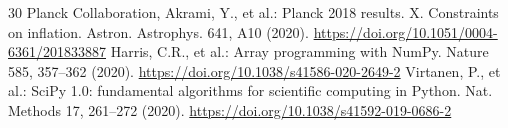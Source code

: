 \documentclass[pdflatex,sn-mathphys-num]{sn-jnl}
\begin{document}
\begin{thebibliography}{30}
 Planck Collaboration, Akrami, Y., et al.: Planck 2018 results. X. Constraints on inflation. Astron. Astrophys. 641, A10 (2020). \url{https://doi.org/10.1051/0004-6361/201833887}
 Harris, C.R., et al.: Array programming with NumPy. Nature 585, 357--362 (2020). \url{https://doi.org/10.1038/s41586-020-2649-2}
 Virtanen, P., et al.: SciPy 1.0: fundamental algorithms for scientific computing in Python. Nat. Methods 17, 261--272 (2020). \url{https://doi.org/10.1038/s41592-019-0686-2}
\end{thebibliography}
\end{document}
